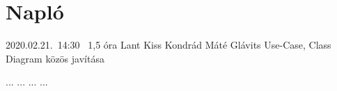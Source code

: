 %
\section{Napló}

\begin{naplo}

\bejegyzes
{2020.02.21.~14:30~} %
{1,5 óra} %
{Lant\newline
Kiss\newline
Kondrád\newline
Máté\newline
Glávits
}{Use-Case, Class Diagram közös javítása} %

\bejegyzes
{...}
{...}
{...}
{...}


\end{naplo}

